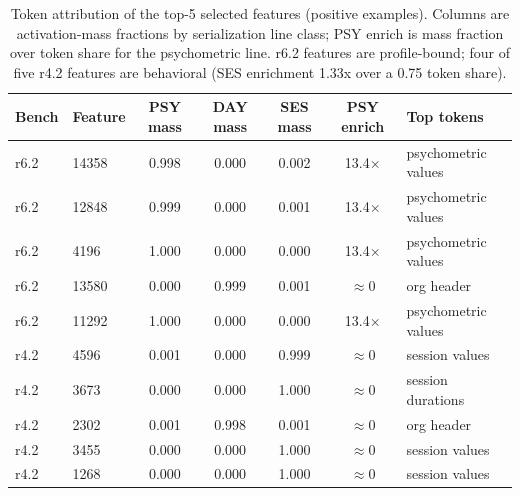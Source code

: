 \begin{table}[htbp]
\caption{Token attribution of the top-5 selected features (positive examples). Columns are activation-mass fractions by serialization line class; PSY enrich is mass fraction over token share for the psychometric line. r6.2 features are profile-bound; four of five r4.2 features are behavioral (SES enrichment 1.33x over a 0.75 token share).}
\label{tab:attribution}
\centering
\footnotesize
\setlength{\tabcolsep}{3pt}
\begin{tabular}{llccccl}
\toprule
Bench & Feature & PSY mass & DAY mass & SES mass & PSY enrich & Top tokens \\
\midrule
r6.2 & 14358 & 0.998 & 0.000 & 0.002 & 13.4$\times$ & psychometric values \\
r6.2 & 12848 & 0.999 & 0.000 & 0.001 & 13.4$\times$ & psychometric values \\
r6.2 & 4196 & 1.000 & 0.000 & 0.000 & 13.4$\times$ & psychometric values \\
r6.2 & 13580 & 0.000 & 0.999 & 0.001 & $\approx$0 & org header \\
r6.2 & 11292 & 1.000 & 0.000 & 0.000 & 13.4$\times$ & psychometric values \\
\midrule
r4.2 & 4596 & 0.001 & 0.000 & 0.999 & $\approx$0 & session values \\
r4.2 & 3673 & 0.000 & 0.000 & 1.000 & $\approx$0 & session durations \\
r4.2 & 2302 & 0.001 & 0.998 & 0.001 & $\approx$0 & org header \\
r4.2 & 3455 & 0.000 & 0.000 & 1.000 & $\approx$0 & session values \\
r4.2 & 1268 & 0.000 & 0.000 & 1.000 & $\approx$0 & session values \\
\bottomrule
\end{tabular}
\end{table}
